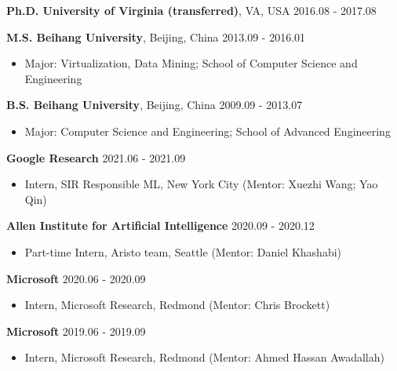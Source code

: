 \documentclass[11pt, a4paper]{article}
\newcommand{\hr}{\hrule\vspace{0.5em}}
\begin{document}
\textbf{Ph.D. University of Virginia (transferred)}, VA, USA \hfill 2016.08 - 2017.08

\textbf{M.S. Beihang University}, Beijing, China \hfill 2013.09 - 2016.01
	\begin{itemize}[leftmargin=20pt]
	\item[] Major: Virtualization, Data Mining; School of Computer Science and Engineering
	\end{itemize}

\textbf{B.S. Beihang University}, Beijing, China \hfill 2009.09 - 2013.07
	\begin{itemize}[leftmargin=20pt]
	\item[] Major: Computer Science and Engineering; School of Advanced Engineering
	\end{itemize}

\textbf{Google Research} \hfill 2021.06 - 2021.09
\begin{itemize}[leftmargin=20pt]
\item[] Intern, SIR Responsible ML, New York City (Mentor: Xuezhi Wang; Yao Qin)
\end{itemize}

\textbf{Allen Institute for Artificial Intelligence} \hfill 2020.09 - 2020.12
\begin{itemize}[leftmargin=20pt]
\item[] Part-time Intern, Aristo team, Seattle (Mentor: Daniel Khashabi)
\end{itemize}

\textbf{Microsoft} \hfill 2020.06 - 2020.09
	\begin{itemize}[leftmargin=20pt]
	\item[] Intern, Microsoft Research, Redmond (Mentor:  Chris Brockett)
	\end{itemize}
	
\textbf{Microsoft} \hfill 2019.06 - 2019.09
	\begin{itemize}[leftmargin=20pt]
	\item[] Intern, Microsoft Research, Redmond (Mentor: Ahmed Hassan Awadallah)
	\end{itemize}
	
\end{document}

